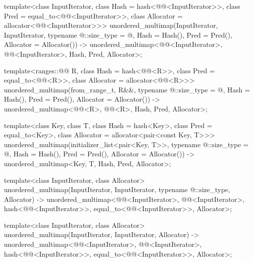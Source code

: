 \begin{codeblock}
{  template<class InputIterator,
           class Hash = hash<@@<InputIterator>>,
           class Pred = equal_to<@@<InputIterator>>,
           class Allocator = allocator<@@<InputIterator>>>
    unordered_multimap(InputIterator, InputIterator,
                       typename @\seebelow@::size_type = @\seebelow@,
                       Hash = Hash(), Pred = Pred(), Allocator = Allocator())
      -> unordered_multimap<@@<InputIterator>, @@<InputIterator>,
                            Hash, Pred, Allocator>;

  template<ranges::@@ R,
           class Hash = hash<@@<R>>,
           class Pred = equal_to<@@<R>>,
           class Allocator = allocator<@@<R>>>
    unordered_multimap(from_range_t, R&&, typename @\seebelow@::size_type = @\seebelow@,
                       Hash = Hash(), Pred = Pred(), Allocator = Allocator())
      -> unordered_multimap<@@<R>, @@<R>, Hash, Pred, Allocator>;

  template<class Key, class T, class Hash = hash<Key>,
           class Pred = equal_to<Key>, class Allocator = allocator<pair<const Key, T>>>
    unordered_multimap(initializer_list<pair<Key, T>>,
                       typename @\seebelow@::size_type = @\seebelow@,
                       Hash = Hash(), Pred = Pred(), Allocator = Allocator())
      -> unordered_multimap<Key, T, Hash, Pred, Allocator>;

  template<class InputIterator, class Allocator>
    unordered_multimap(InputIterator, InputIterator, typename @\seebelow@::size_type, Allocator)
      -> unordered_multimap<@@<InputIterator>, @@<InputIterator>,
                            hash<@@<InputIterator>>,
                            equal_to<@@<InputIterator>>, Allocator>;

  template<class InputIterator, class Allocator>
    unordered_multimap(InputIterator, InputIterator, Allocator)
      -> unordered_multimap<@@<InputIterator>, @@<InputIterator>,
                            hash<@@<InputIterator>>,
                            equal_to<@@<InputIterator>>, Allocator>;

}
\end{codeblock}
